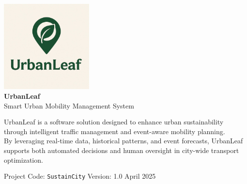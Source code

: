 \begin{titlepage}
\centering

\vspace*{2cm}

\includegraphics[width=0.35\textwidth]{Images/UrbanLeaf.jpeg} \\[1.5cm]

{\Huge \textbf{UrbanLeaf}}\\[0.5cm]
{\large Smart Urban Mobility Management System} \\[1cm]

\parbox{0.85\textwidth}{
\centering
UrbanLeaf is a software solution designed to enhance urban sustainability through intelligent traffic management and event-aware mobility planning.\\[1mm]
By leveraging real-time data, historical patterns, and event forecasts, UrbanLeaf supports both automated decisions and human oversight in city-wide transport optimization.
}

\vfill

{\small Project Code: \texttt{SustainCity} \hspace{1cm} Version: 1.0 \hspace{1cm} April 2025}

\end{titlepage}
